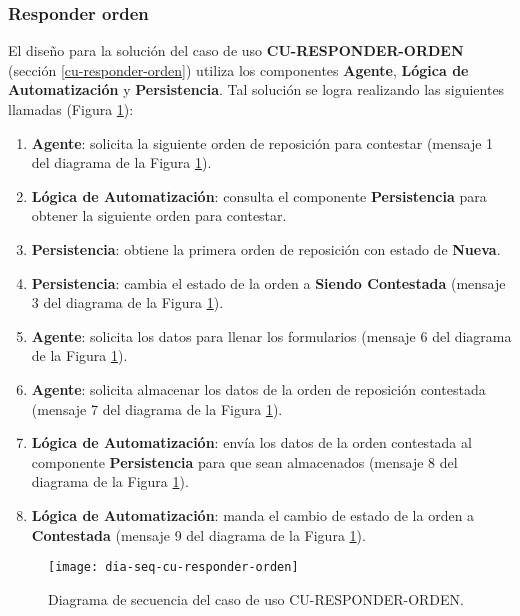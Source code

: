 \subsubsection{Responder orden}
El diseño para la solución del caso de uso \textbf{CU-RESPONDER-ORDEN} (sección \ref{cu-responder-orden}) utiliza los componentes \textbf{Agente}, \textbf{Lógica de Automatización} y \textbf{Persistencia}. Tal solución se logra realizando las siguientes llamadas (Figura \ref{fig:dia-seq-cu-responder-orden}):
\begin{enumerate}
	\item \textbf{Agente}: solicita la siguiente orden de reposición para contestar (mensaje 1 del diagrama de la Figura \ref{fig:dia-seq-cu-responder-orden}).
	\item \textbf{Lógica de Automatización}: consulta el componente \textbf{Persistencia} para obtener la siguiente orden para contestar.
	\item \textbf{Persistencia}: obtiene la primera orden de reposición con estado de \textbf{Nueva}.
	\item \textbf{Persistencia}: cambia el estado de la orden a \textbf{Siendo Contestada} (mensaje 3 del diagrama de la Figura \ref{fig:dia-seq-cu-responder-orden}).
	\item \textbf{Agente}: solicita los datos para llenar los formularios (mensaje 6 del diagrama de la Figura \ref{fig:dia-seq-cu-responder-orden}).
	\item \textbf{Agente}: solicita almacenar los datos de la orden de reposición contestada (mensaje 7 del diagrama de la Figura \ref{fig:dia-seq-cu-responder-orden}).
	\item \textbf{Lógica de Automatización}: envía los datos de la orden contestada al componente \textbf{Persistencia} para que sean almacenados (mensaje 8 del diagrama de la Figura \ref{fig:dia-seq-cu-responder-orden}).
	\item \textbf{Lógica de Automatización}: manda el cambio de estado de la orden a \textbf{Contestada} (mensaje 9 del diagrama de la Figura \ref{fig:dia-seq-cu-responder-orden}).
\end{enumerate}
\begin{figure}[h]
	\centering
	\texttt{[image: dia-seq-cu-responder-orden]}
	\caption{Diagrama de secuencia del caso de uso CU-RESPONDER-ORDEN.}
	\label{fig:dia-seq-cu-responder-orden}
\end{figure}

